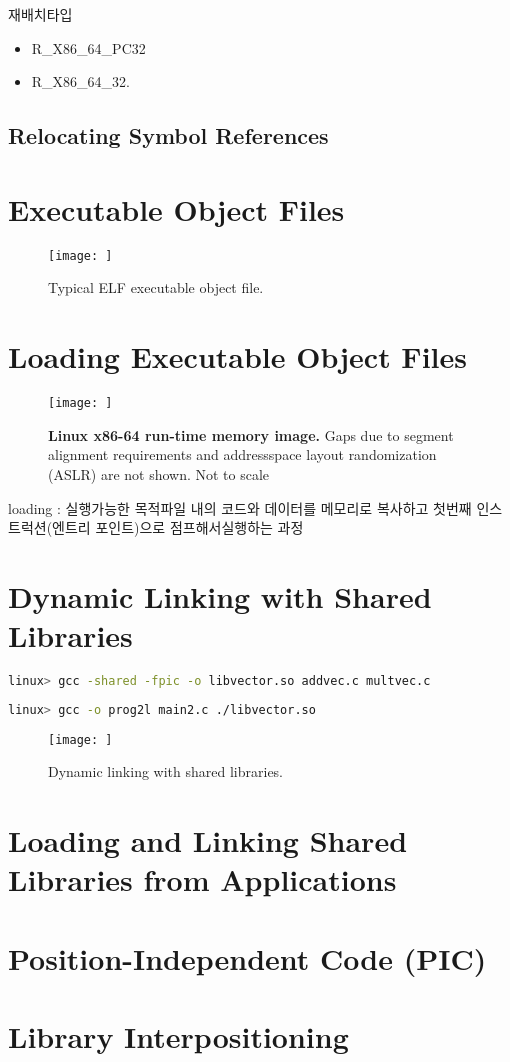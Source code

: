 재배치타입
\begin{itemize}
    \item R_X86_64_PC32
    \item R_X86_64_32.
\end{itemize}
\subsection{Relocating Symbol References}


\section{Executable Object Files}


\begin{figure}[h!]
    \centering
    \texttt{[image: ]}
    \caption{Typical ELF executable object file.}
\end{figure}

\section{Loading Executable Object Files}

\begin{figure}[h!]
    \centering
    \texttt{[image: ]}
    \caption{\textbf{Linux x86-64 run-time memory image.} 
    Gaps due to segment alignment requirements and addressspace layout randomization (ASLR) are not shown. Not to scale}
\end{figure}

loading : 실행가능한 목적파일 내의 코드와 데이터를 메모리로 복사하고 첫번째 인스트럭션(엔트리 포인트)으로 점프해서실행하는 과정

\section{Dynamic Linking with Shared Libraries}

\begin{lstlisting}[language=bash]
linux> gcc -shared -fpic -o libvector.so addvec.c multvec.c
\end{lstlisting}

\begin{lstlisting}[language=bash]
    linux> gcc -o prog2l main2.c ./libvector.so
\end{lstlisting}

\begin{figure}[h!]
    \centering
    \texttt{[image: ]}
    \caption{Dynamic linking with shared libraries.}
\end{figure}



\section{Loading and Linking Shared Libraries from Applications}

\section{Position-Independent Code (PIC)}


\section{Library Interpositioning}
